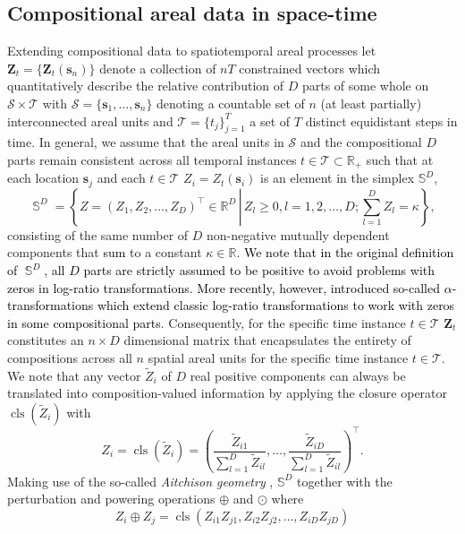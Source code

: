 \documentclass[12pt]{article}
\theoremstyle{plain}
\theoremstyle{definition}
\newcommand{\R}{\mathds{R}}
\newcommand{\xvec}{\boldsymbol}
\newcommand{\xmat}{\mathbf}
\DeclareMathOperator{\cls}{cls}
\DeclareMathOperator{\si}{\mathds{S}}
\begin{document}
\subsection{Compositional areal data in space-time}\label{sec:prelim}

Extending compositional data to spatiotemporal areal processes let $\xmat{Z}_t=\lbrace \xvec{Z}_{t}(\xvec{s}_n) \rbrace$ denote a collection of $nT$ constrained vectors which quantitatively describe the relative contribution of $D$ parts of some whole on $\mathcal{S}\times \mathcal{T}$ with $\mathcal{S} = \lbrace\xvec{s}_1, \ldots, \xvec{s}_n\rbrace$ denoting a countable set of $n$ (at least partially) interconnected areal units and $\mathcal{T} =\lbrace t_j\rbrace^T_{j=1}$ a set of $T$ distinct equidistant steps in time. In general, we assume that the areal units in $\mathcal{S}$ and the compositional $D$ parts remain consistent across all temporal instances $t\in \mathcal{T}\subset \R_+$ such that at each location $\xvec{s}_j$ and each $t\in \mathcal{T}$ $Z_i=Z_t(\xvec{s}_i)$ is an element in the simplex $\mathds{S}^{D}$,
\[
\si^{D}=\left\{Z =(Z_{1},Z_{2},\dots ,Z_{D})^{\top}\in \mathds {R}^{D}\,\left|\,Z_{l}\geq 0,l=1,2,\dots ,D;\sum_{l=1}^{D}Z_{l}=\kappa \right.\right\}, 
\]
consisting of the same number of $D$ non-negative mutually dependent components that \textcolor{black}{sum} to a constant $\kappa\in\mathds{R}$. \textcolor{black}{We note that in the original definition of $\si^{D}$, all $D$ parts are strictly assumed to be positive to avoid problems with zeros in log-ratio transformations. More recently, however, \cite{Tsagris2016} introduced so-called $\alpha$-transformations which extend classic log-ratio transformations to work with zeros in some compositional parts}. Consequently, for the specific time instance $t\in \mathcal{T}$ $\xvec{Z}_t$ constitutes an $n \times D$ dimensional matrix that encapsulates the entirety of compositions across all $n$ spatial areal units for the specific time instance $t\in \mathcal{T}$. We note that any vector $\widetilde{Z}_i$ of $D$ real positive components can always be translated into composition-valued information by applying the closure operator $\cls(\widetilde{Z}_i)$ with 
\[
Z_i=\cls(\widetilde{Z}_i)=
\left(\frac{\tilde{Z}_{i1}}{\sum_{l=1}^D \tilde{Z}_{il}},\ldots,\frac{\tilde{Z}_{iD}}{\sum_{l=1}^D \tilde{Z}_{il}}\right)^\top.
\]
Making use of the so-called \textit{Aitchison geometry} \citep{MR1873662}, $\mathds{S}^D$ together with the perturbation and powering operations $\oplus$ and $\odot$ where 
\[
Z_i\oplus Z_j=\cls(Z_{i1}Z_{j1},Z_{i2}Z_{j2},\ldots, Z_{iD}Z_{jD})
\]
\end{document}
